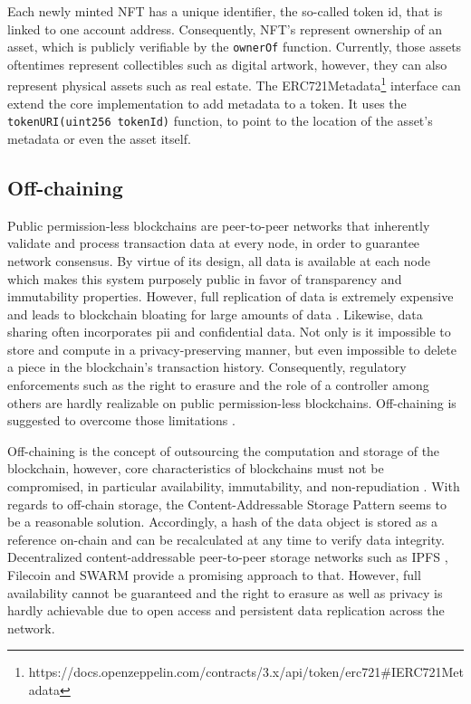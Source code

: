 Each newly minted NFT has a unique identifier, the so-called token id, that is linked to one account address. Consequently, NFT's represent ownership of an asset, which is publicly verifiable by the \texttt{ownerOf} function. Currently, those assets oftentimes represent collectibles such as digital artwork, however, they can also represent physical assets such as real estate. The ERC721Metadata\footnote{https://docs.openzeppelin.com/contracts/3.x/api/token/erc721\#IERC721Metadata} interface can extend the core implementation to add metadata to a token. It uses the \texttt{tokenURI(uint256 tokenId)} function, to point to the location of the asset's metadata or even the asset itself.

\subsection{Off-chaining}
\label{subsec:onoff}

Public permission-less blockchains are peer-to-peer networks that inherently validate and process transaction data at every node, in order to guarantee network consensus. By virtue of its design, all data is available at each node which makes this system purposely public in favor of transparency and immutability properties. However, full replication of data is extremely expensive and leads to blockchain bloating for large amounts of data \cite{eberhardtBlockchainInsightsOffChaining2017}. Likewise, data sharing often incorporates \acrshort{pii} and confidential data. Not only is it impossible to store and compute in a privacy-preserving manner, but even impossible to delete a piece in the blockchain's transaction history. Consequently, regulatory enforcements such as the right to erasure \cite[Art. 17]{european_commission_regulation_2016} and the role of a controller \cite[Art. 4 (7)]{european_commission_regulation_2016} among others are hardly realizable on public permission-less blockchains. Off-chaining is suggested to overcome those limitations \cite{eberhardtBlockchainInsightsOffChaining2017}.

Off-chaining is the concept of outsourcing the computation and storage of the blockchain, however, core characteristics of blockchains must not be compromised, in particular availability, immutability, and non-repudiation \cite{eberhardtOffchainingModelsApproaches2018,eberhardtBlockchainInsightsOffChaining2017}. With regards to off-chain storage, the Content-Addressable Storage Pattern \cite{eberhardtBlockchainInsightsOffChaining2017} seems to be a reasonable solution. Accordingly, a hash of the data object is stored as a reference on-chain and can be recalculated at any time to verify data integrity. Decentralized content-addressable peer-to-peer storage networks such as IPFS \cite{benetIPFSContentAddressed2014}, Filecoin \cite{filecoin} and SWARM \cite{swarm} provide a promising approach to that. However, full availability cannot be guaranteed \cite{eberhardtOffchainingModelsApproaches2018} and the right to erasure \cite[Art. 17]{european_commission_regulation_2016} as well as privacy is hardly achievable due to open access and persistent data replication across the network.

